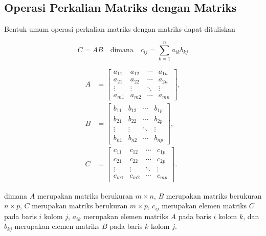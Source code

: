 \subsection{Operasi Perkalian Matriks dengan Matriks}

Bentuk umum operasi perkalian matriks dengan matriks dapat dituliskan

\begin{equation}
  \label{eq:matrix_mult_matrix}C = AB \quad \text{dimana}\quad c_{ij}= \sum_{k=1}
  ^{n}a_{ik}b_{kj}
\end{equation}

\begin{align*}
  A & = \begin{bmatrix}a_{11}&a_{12}&\cdots&a_{1n}\\ a_{21}&a_{22}&\cdots&a_{2n}\\ \vdots&\vdots&\ddots&\vdots \\ a_{m1}&a_{m2}&\cdots&a_{mn}\end{bmatrix}, \\
  B & = \begin{bmatrix}b_{11}&b_{12}&\cdots&b_{1p}\\ b_{21}&b_{22}&\cdots&b_{2p}\\ \vdots&\vdots&\ddots&\vdots \\ b_{n1}&b_{n2}&\cdots&b_{np}\end{bmatrix}, \\
  C & = \begin{bmatrix}c_{11}&c_{12}&\cdots&c_{1p}\\ c_{21}&c_{22}&\cdots&c_{2p}\\ \vdots&\vdots&\ddots&\vdots \\ c_{m1}&c_{m2}&\cdots&c_{mp}\end{bmatrix}.
\end{align*}

\noindent
dimana $A$ merupakan matriks berukuran $m \times n$, $B$ merupakan matriks
berukuran $n \times p$, $C$ merupakan matriks berukuran $m \times p$, $c_{ij}$
merupakan elemen matriks $C$ pada baris $i$ kolom $j$, $a_{ik}$ merupakan elemen
matriks $A$ pada baris $i$ kolom $k$, dan $b_{kj}$ merupakan elemen matriks $B$
pada baris $k$ kolom $j$.

